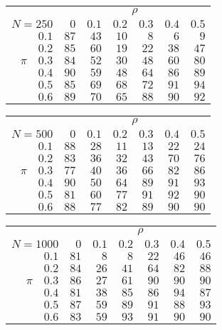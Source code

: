 \begin{tabular}{r|rrrrrr}
\hline\hline
 &\multicolumn{6}{c}{$\rho$} \\ 
 $N = 250$ & $0$ & $0.1$ & $0.2$ & $0.3$ & $0.4$ & $0.5$ \\ 
 \hline$0.1$ & $87$ & $43$ & $10$ & $8$ & $6$ & $9$\\ 
$0.2$ & $85$ & $60$ & $19$ & $22$ & $38$ & $47$\\ 
$\pi\quad$$0.3$ & $84$ & $52$ & $30$ & $48$ & $60$ & $80$\\ 
$0.4$ & $90$ & $59$ & $48$ & $64$ & $86$ & $89$\\ 
$0.5$ & $85$ & $69$ & $68$ & $72$ & $91$ & $94$\\ 
$0.6$ & $89$ & $70$ & $65$ & $88$ & $90$ & $92$\\ 
 \hline 
 \end{tabular}
 
 \vspace{2em} 
 
\begin{tabular}{r|rrrrrr}
\hline\hline
 &\multicolumn{6}{c}{$\rho$} \\ 
 $N = 500$ & $0$ & $0.1$ & $0.2$ & $0.3$ & $0.4$ & $0.5$ \\ 
 \hline$0.1$ & $88$ & $28$ & $11$ & $13$ & $22$ & $24$\\ 
$0.2$ & $83$ & $36$ & $32$ & $43$ & $70$ & $76$\\ 
$\pi\quad$$0.3$ & $77$ & $40$ & $36$ & $66$ & $82$ & $86$\\ 
$0.4$ & $90$ & $50$ & $64$ & $89$ & $91$ & $93$\\ 
$0.5$ & $81$ & $60$ & $77$ & $91$ & $92$ & $90$\\ 
$0.6$ & $88$ & $77$ & $82$ & $89$ & $90$ & $90$\\ 
 \hline 
 \end{tabular}
 
 \vspace{2em} 
 
\begin{tabular}{r|rrrrrr}
\hline\hline
 &\multicolumn{6}{c}{$\rho$} \\ 
 $N = 1000$ & $0$ & $0.1$ & $0.2$ & $0.3$ & $0.4$ & $0.5$ \\ 
 \hline$0.1$ & $81$ & $8$ & $8$ & $22$ & $46$ & $46$\\ 
$0.2$ & $84$ & $26$ & $41$ & $64$ & $82$ & $88$\\ 
$\pi\quad$$0.3$ & $86$ & $27$ & $61$ & $90$ & $90$ & $90$\\ 
$0.4$ & $81$ & $38$ & $85$ & $86$ & $94$ & $87$\\ 
$0.5$ & $87$ & $59$ & $89$ & $91$ & $88$ & $93$\\ 
$0.6$ & $83$ & $59$ & $93$ & $91$ & $90$ & $90$\\ 
 \hline 
 \end{tabular}